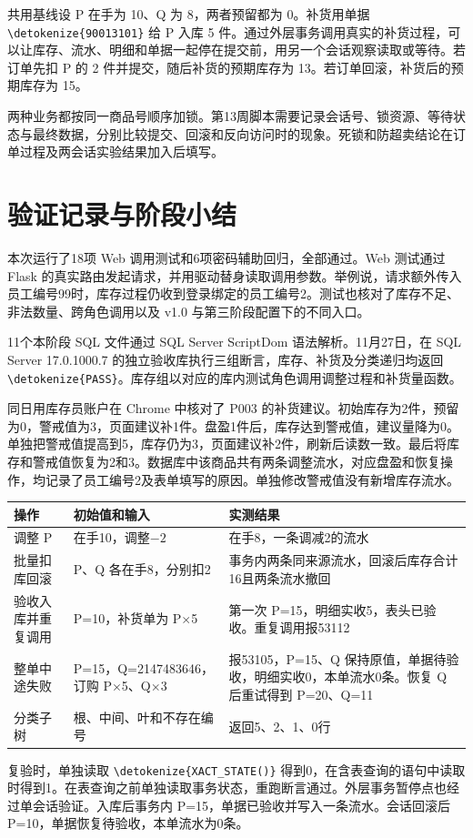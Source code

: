 \documentclass{SYSUReport}
\newcommand{\code}[1]{\expandafter\nolinkurl\expandafter{\detokenize{#1}}}
\begin{document}
共用基线设 P 在手为 10、Q 为 8，两者预留都为 0。补货用单据 \code{90013101} 给 P 入库 5 件。通过外层事务调用真实的补货过程，可以让库存、流水、明细和单据一起停在提交前，用另一个会话观察读取或等待。若订单先扣 P 的 2 件并提交，随后补货的预期库存为 13。若订单回滚，补货后的预期库存为 15。

两种业务都按同一商品号顺序加锁。第13周脚本需要记录会话号、锁资源、等待状态与最终数据，分别比较提交、回滚和反向访问时的现象。死锁和防超卖结论在订单过程及两会话实验结果加入后填写。

\section{验证记录与阶段小结}

本次运行了18项 Web 调用测试和6项密码辅助回归，全部通过。Web 测试通过 Flask 的真实路由发起请求，并用驱动替身读取调用参数。举例说，请求额外传入员工编号99时，库存过程仍收到登录绑定的员工编号2。测试也核对了库存不足、非法数量、跨角色调用以及 v1.0 与第三阶段配置下的不同入口。

11个本阶段 SQL 文件通过 SQL Server ScriptDom 语法解析。11月27日，在 SQL Server 17.0.1000.7 的独立验收库执行三组断言，库存、补货及分类递归均返回 \code{PASS}。库存组以对应的库内测试角色调用调整过程和补货量函数。

同日用库存员账户在 Chrome 中核对了 P003 的补货建议。初始库存为2件，预留为0，警戒值为3，页面建议补1件。盘盈1件后，库存达到警戒值，建议量降为0。单独把警戒值提高到5，库存仍为3，页面建议补2件，刷新后读数一致。最后将库存和警戒值恢复为2和3。数据库中该商品共有两条调整流水，对应盘盈和恢复操作，均记录了员工编号2及表单填写的原因。单独修改警戒值没有新增库存流水。

\begin{center}
\begin{tabularx}{\textwidth}{p{3.4cm}YY}
\toprule
操作 & 初始值和输入 & 实测结果 \\
\midrule
调整 P & 在手10，调整$-2$ & 在手8，一条调减2的流水 \\
批量扣库回滚 & P、Q 各在手8，分别扣2 & 事务内两条同来源流水，回滚后库存合计16且两条流水撤回 \\
验收入库并重复调用 & P=10，补货单为 P$\times$5 & 第一次 P=15，明细实收5，表头已验收。重复调用报53112 \\
整单中途失败 & P=15，Q=2147483646，订购 P$\times$5、Q$\times$3 & 报53105，P=15、Q 保持原值，单据待验收，明细实收0，本单流水0条。恢复 Q 后重试得到 P=20、Q=11 \\
分类子树 & 根、中间、叶和不存在编号 & 返回5、2、1、0行 \\
\bottomrule
\end{tabularx}
\end{center}

复验时，单独读取 \code{XACT_STATE()} 得到0，在含表查询的语句中读取时得到1。在表查询之前单独读取事务状态，重跑断言通过。外层事务暂停点也经过单会话验证。入库后事务内 P=15，单据已验收并写入一条流水。会话回滚后 P=10，单据恢复待验收，本单流水为0条。
\end{document}
